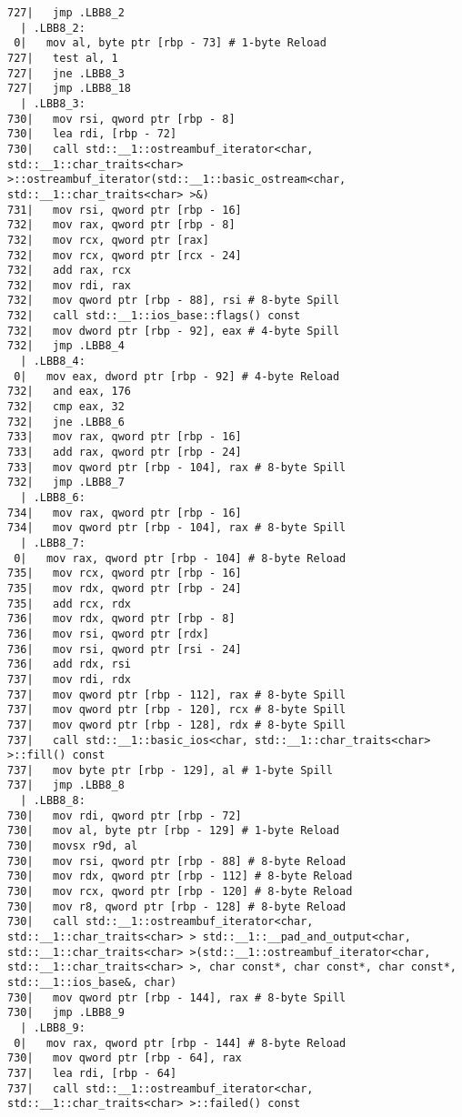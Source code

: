 \begin{lstlisting}[language={},numbers=none,title=\href{https://godbolt.org/z/hwKje8}{\texttt{godbolt.org/z/hwKje8}}]
727|   jmp .LBB8_2
  | .LBB8_2:
 0|   mov al, byte ptr [rbp - 73] # 1-byte Reload
727|   test al, 1
727|   jne .LBB8_3
727|   jmp .LBB8_18
  | .LBB8_3:
730|   mov rsi, qword ptr [rbp - 8]
730|   lea rdi, [rbp - 72]
730|   call std::__1::ostreambuf_iterator<char, std::__1::char_traits<char> >::ostreambuf_iterator(std::__1::basic_ostream<char, std::__1::char_traits<char> >&)
731|   mov rsi, qword ptr [rbp - 16]
732|   mov rax, qword ptr [rbp - 8]
732|   mov rcx, qword ptr [rax]
732|   mov rcx, qword ptr [rcx - 24]
732|   add rax, rcx
732|   mov rdi, rax
732|   mov qword ptr [rbp - 88], rsi # 8-byte Spill
732|   call std::__1::ios_base::flags() const
732|   mov dword ptr [rbp - 92], eax # 4-byte Spill
732|   jmp .LBB8_4
  | .LBB8_4:
 0|   mov eax, dword ptr [rbp - 92] # 4-byte Reload
732|   and eax, 176
732|   cmp eax, 32
732|   jne .LBB8_6
733|   mov rax, qword ptr [rbp - 16]
733|   add rax, qword ptr [rbp - 24]
733|   mov qword ptr [rbp - 104], rax # 8-byte Spill
732|   jmp .LBB8_7
  | .LBB8_6:
734|   mov rax, qword ptr [rbp - 16]
734|   mov qword ptr [rbp - 104], rax # 8-byte Spill
  | .LBB8_7:
 0|   mov rax, qword ptr [rbp - 104] # 8-byte Reload
735|   mov rcx, qword ptr [rbp - 16]
735|   mov rdx, qword ptr [rbp - 24]
735|   add rcx, rdx
736|   mov rdx, qword ptr [rbp - 8]
736|   mov rsi, qword ptr [rdx]
736|   mov rsi, qword ptr [rsi - 24]
736|   add rdx, rsi
737|   mov rdi, rdx
737|   mov qword ptr [rbp - 112], rax # 8-byte Spill
737|   mov qword ptr [rbp - 120], rcx # 8-byte Spill
737|   mov qword ptr [rbp - 128], rdx # 8-byte Spill
737|   call std::__1::basic_ios<char, std::__1::char_traits<char> >::fill() const
737|   mov byte ptr [rbp - 129], al # 1-byte Spill
737|   jmp .LBB8_8
  | .LBB8_8:
730|   mov rdi, qword ptr [rbp - 72]
730|   mov al, byte ptr [rbp - 129] # 1-byte Reload
730|   movsx r9d, al
730|   mov rsi, qword ptr [rbp - 88] # 8-byte Reload
730|   mov rdx, qword ptr [rbp - 112] # 8-byte Reload
730|   mov rcx, qword ptr [rbp - 120] # 8-byte Reload
730|   mov r8, qword ptr [rbp - 128] # 8-byte Reload
730|   call std::__1::ostreambuf_iterator<char, std::__1::char_traits<char> > std::__1::__pad_and_output<char, std::__1::char_traits<char> >(std::__1::ostreambuf_iterator<char, std::__1::char_traits<char> >, char const*, char const*, char const*, std::__1::ios_base&, char)
730|   mov qword ptr [rbp - 144], rax # 8-byte Spill
730|   jmp .LBB8_9
  | .LBB8_9:
 0|   mov rax, qword ptr [rbp - 144] # 8-byte Reload
730|   mov qword ptr [rbp - 64], rax
737|   lea rdi, [rbp - 64]
737|   call std::__1::ostreambuf_iterator<char, std::__1::char_traits<char> >::failed() const

\end{lstlisting}
